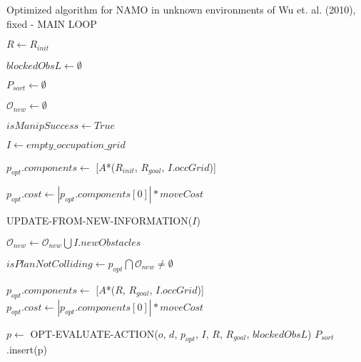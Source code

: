\begin{algorithm}[H]

  \caption{Optimized algorithm for NAMO in unknown environments of Wu et. al. (2010), fixed - MAIN LOOP}

  \label{alg:01-wu-optimized-part1}

  \begin{algorithmic}[1]


        \State $R \gets R_{init}$ \label{lst:line:01_plan_execution_loop_1}

        \State $blockedObsL \gets \emptyset$

        \State $P_{sort} \gets \emptyset$

        \State $\mathcal{O}_{new} \gets \emptyset$

        \State $isManipSuccess \gets True$

        \State $I \gets empty\_occupation\_grid$

        \State $p_{opt}.components \gets$ [$A$*($R_{init}$, $R_{goal}$, $I.occGrid$)]

        \State $p_{opt}.cost \gets |p_{opt}.components[0]| * moveCost$


          \State UPDATE-FROM-NEW-INFORMATION($I$)\label{lst:line:update-from-new-information_note}

          \State $\mathcal{O}_{new} \gets \mathcal{O}_{new} \bigcup I.newObstacles$

          \State $isPlanNotColliding \gets p_{opt} \bigcap \mathcal{O}_{new} \neq \emptyset$ \label{lst:line:intersection_note}


            \State $p_{opt}.components \gets$ [$A$*($R$, $R_{goal}$, $I.occGrid$)]
            \State $p_{opt}.cost \gets |p_{opt}.components[0]| * moveCost$ \label{lst:line:01_plan_execution_loop_2}

             \label{lst:line:01_obstacle evaluation_loop_1}
                \State $p \gets$ OPT-EVALUATE-ACTION($o$, $d$, $p_{opt}$, $I$, $R$, $R_{goal}$, $blockedObsL$)
                  \State $P_{sort}$.insert(p)
                \EndIf
              \EndFor
            \EndFor


\end{algorithmic}
\end{algorithm}
